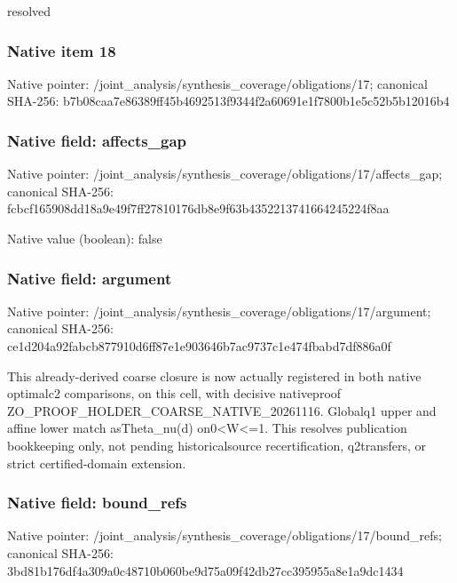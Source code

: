 \documentclass[10pt,a4paper]{article}
\begin{document}
\begingroup\raggedright\sloppy resolved\par\endgroup

\subsubsection{Native item 18}
Native pointer: /joint\_\allowbreak{}analysis/synthesis\_\allowbreak{}coverage/obligations/17; canonical SHA-256: b7b08caa7e86389ff45b4692513f9344f2a60691e1f7800b1e5c52b5b12016b4

\subsubsection{Native field: affects\_\allowbreak{}gap}
Native pointer: /joint\_\allowbreak{}analysis/synthesis\_\allowbreak{}coverage/obligations/17/affects\_\allowbreak{}gap; canonical SHA-256: fcbcf165908dd18a9e49f7ff27810176db8e9f63b4352213741664245224f8aa

Native value (boolean): false

\subsubsection{Native field: argument}
Native pointer: /joint\_\allowbreak{}analysis/synthesis\_\allowbreak{}coverage/obligations/17/argument; canonical SHA-256: ce1d204a92fabcb877910d6ff87e1e903646b7ac9737c1e474fbabd7df886a0f

\begingroup\raggedright\sloppy This already-derived coarse closure is now actually registered in both native optimalc2 comparisons,\allowbreak{} on this cell,\allowbreak{} with decisive nativeproof ZO\_\allowbreak{}PROOF\_\allowbreak{}HOLDER\_\allowbreak{}COARSE\_\allowbreak{}NATIVE\_\allowbreak{}20261116. Globalq1 upper and affine lower match asTheta\_\allowbreak{}nu(d) on0<W<=\allowbreak{}1. This resolves publication bookkeeping only,\allowbreak{} not pending historicalsource recertification,\allowbreak{} q2transfers,\allowbreak{} or strict certified-domain extension.\par\endgroup

\subsubsection{Native field: bound\_\allowbreak{}refs}
Native pointer: /joint\_\allowbreak{}analysis/synthesis\_\allowbreak{}coverage/obligations/17/bound\_\allowbreak{}refs; canonical SHA-256: 3bd81b176df4a309a0c48710b060be9d75a09f42db27cc395955a8e1a9dc1434
\end{document}
